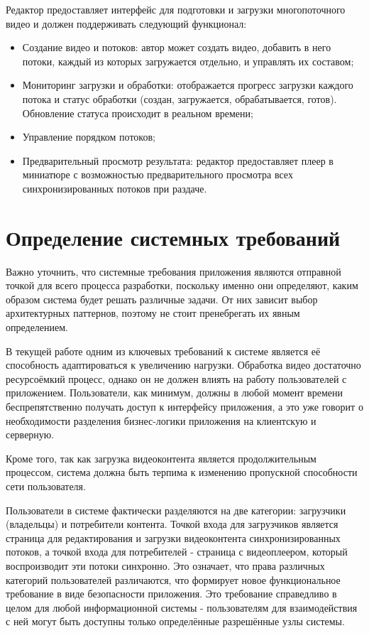 	Редактор предоставляет интерфейс для подготовки и загрузки многопоточного видео и должен поддерживать следующий функционал:
	\begin{itemize}[label=$\bullet$]
		\item Создание видео и потоков: автор может создать видео, добавить в него потоки, каждый из которых загружается отдельно, и управлять их составом;
		\item Мониторинг загрузки и обработки: отображается прогресс загрузки каждого потока и статус обработки (создан, загружается, обрабатывается, готов). Обновление статуса происходит в реальном времени;
		\item Управление порядком потоков;
		\item Предварительный просмотр результата: редактор предоставляет плеер в миниатюре с возможностью предварительного просмотра всех синхронизированных потоков при раздаче.
	\end{itemize}

\section{Определение системных требований} \label{ch2:system_requirements}

	Важно уточнить, что системные требования приложения являются отправной точкой для всего процесса разработки, поскольку именно они определяют, каким образом система будет решать различные задачи. От них зависит выбор архитектурных паттернов, поэтому не стоит пренебрегать их явным определением.
	
	В текущей работе одним из ключевых требований к системе является её способность адаптироваться к увеличению нагрузки. Обработка видео достаточно ресурсоёмкий процесс, однако он не должен влиять на работу пользователей с приложением. Пользователи, как минимум, должны в любой момент времени беспрепятственно получать доступ к интерфейсу приложения, а это уже говорит о необходимости разделения бизнес-логики приложения на клиентскую и серверную.
	
	Кроме того, так как загрузка видеоконтента является продолжительным процессом, система должна быть терпима к изменению пропускной способности сети пользователя.
	
	Пользователи в системе фактически разделяются на две категории: загрузчики (владельцы) и потребители контента. Точкой входа для загрузчиков является страница для редактирования и загрузки видеоконтента синхронизированных потоков, а точкой входа для потребителей - страница с видеоплеером, который воспроизводит эти потоки синхронно. Это означает, что права различных категорий пользователей различаются, что формирует новое функциональное требование в виде безопасности приложения. Это требование справедливо в целом для любой информационной системы - пользователям для взаимодействия с ней могут быть доступны только определённые разрешённые узлы системы.
	
